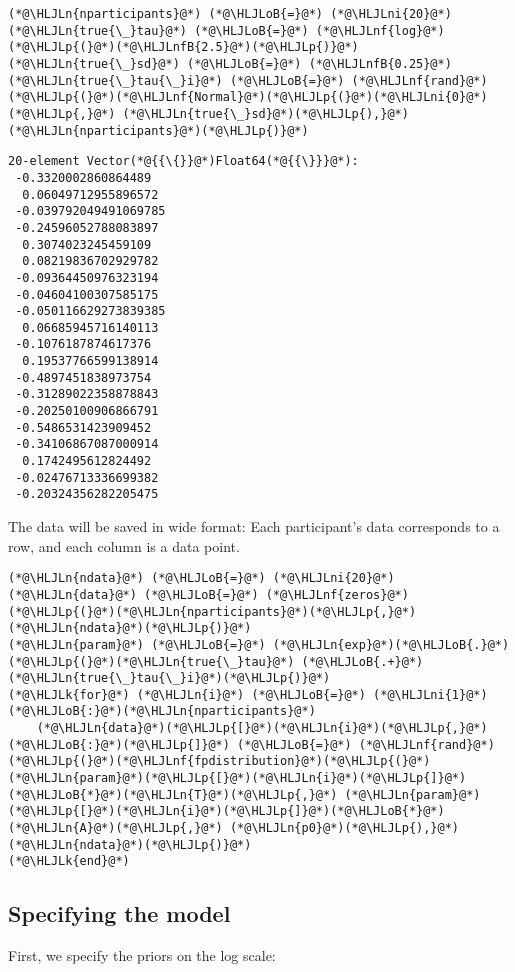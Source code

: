 \documentclass[12pt,a4paper]{article}
\newcommand{\HLJLk}[1]{\textcolor[RGB]{148,91,176}{\textbf{#1}}}
\newcommand{\HLJLn}[1]{#1}
\newcommand{\HLJLnf}[1]{\textcolor[RGB]{66,102,213}{#1}}
\newcommand{\HLJLnfB}[1]{\textcolor[RGB]{59,151,46}{#1}}
\newcommand{\HLJLni}[1]{\textcolor[RGB]{59,151,46}{#1}}
\newcommand{\HLJLoB}[1]{\textcolor[RGB]{102,102,102}{\textbf{#1}}}
\newcommand{\HLJLp}[1]{#1}
\begin{document}
\begin{lstlisting}
(*@\HLJLn{nparticipants}@*) (*@\HLJLoB{=}@*) (*@\HLJLni{20}@*)
(*@\HLJLn{true{\_}tau}@*) (*@\HLJLoB{=}@*) (*@\HLJLnf{log}@*)(*@\HLJLp{(}@*)(*@\HLJLnfB{2.5}@*)(*@\HLJLp{)}@*)
(*@\HLJLn{true{\_}sd}@*) (*@\HLJLoB{=}@*) (*@\HLJLnfB{0.25}@*)
(*@\HLJLn{true{\_}tau{\_}i}@*) (*@\HLJLoB{=}@*) (*@\HLJLnf{rand}@*)(*@\HLJLp{(}@*)(*@\HLJLnf{Normal}@*)(*@\HLJLp{(}@*)(*@\HLJLni{0}@*)(*@\HLJLp{,}@*) (*@\HLJLn{true{\_}sd}@*)(*@\HLJLp{),}@*) (*@\HLJLn{nparticipants}@*)(*@\HLJLp{)}@*)
\end{lstlisting}

\begin{lstlisting}
20-element Vector(*@{{\{}}@*)Float64(*@{{\}}}@*):
 -0.3320002860864489
  0.06049712955896572
 -0.039792049491069785
 -0.24596052788083897
  0.3074023245459109
  0.08219836702929782
 -0.09364450976323194
 -0.04604100307585175
 -0.050116629273839385
  0.06685945716140113
 -0.1076187874617376
  0.19537766599138914
 -0.4897451838973754
 -0.31289022358878843
 -0.20250100906866791
 -0.5486531423909452
 -0.34106867087000914
  0.1742495612824492
 -0.02476713336699382
 -0.20324356282205475
\end{lstlisting}


The data will be saved in wide format: Each participant's data corresponds to a row, and each column is a data point.


\begin{lstlisting}
(*@\HLJLn{ndata}@*) (*@\HLJLoB{=}@*) (*@\HLJLni{20}@*)
(*@\HLJLn{data}@*) (*@\HLJLoB{=}@*) (*@\HLJLnf{zeros}@*)(*@\HLJLp{(}@*)(*@\HLJLn{nparticipants}@*)(*@\HLJLp{,}@*) (*@\HLJLn{ndata}@*)(*@\HLJLp{)}@*)
(*@\HLJLn{param}@*) (*@\HLJLoB{=}@*) (*@\HLJLn{exp}@*)(*@\HLJLoB{.}@*)(*@\HLJLp{(}@*)(*@\HLJLn{true{\_}tau}@*) (*@\HLJLoB{.+}@*) (*@\HLJLn{true{\_}tau{\_}i}@*)(*@\HLJLp{)}@*)
(*@\HLJLk{for}@*) (*@\HLJLn{i}@*) (*@\HLJLoB{=}@*) (*@\HLJLni{1}@*)(*@\HLJLoB{:}@*)(*@\HLJLn{nparticipants}@*)
    (*@\HLJLn{data}@*)(*@\HLJLp{[}@*)(*@\HLJLn{i}@*)(*@\HLJLp{,}@*)(*@\HLJLoB{:}@*)(*@\HLJLp{]}@*) (*@\HLJLoB{=}@*) (*@\HLJLnf{rand}@*)(*@\HLJLp{(}@*)(*@\HLJLnf{fpdistribution}@*)(*@\HLJLp{(}@*)(*@\HLJLn{param}@*)(*@\HLJLp{[}@*)(*@\HLJLn{i}@*)(*@\HLJLp{]}@*)(*@\HLJLoB{*}@*)(*@\HLJLn{T}@*)(*@\HLJLp{,}@*) (*@\HLJLn{param}@*)(*@\HLJLp{[}@*)(*@\HLJLn{i}@*)(*@\HLJLp{]}@*)(*@\HLJLoB{*}@*)(*@\HLJLn{A}@*)(*@\HLJLp{,}@*) (*@\HLJLn{p0}@*)(*@\HLJLp{),}@*) (*@\HLJLn{ndata}@*)(*@\HLJLp{)}@*)
(*@\HLJLk{end}@*)
\end{lstlisting}


\subsection{Specifying the model}
First, we specify the priors on the log scale:
\end{document}
